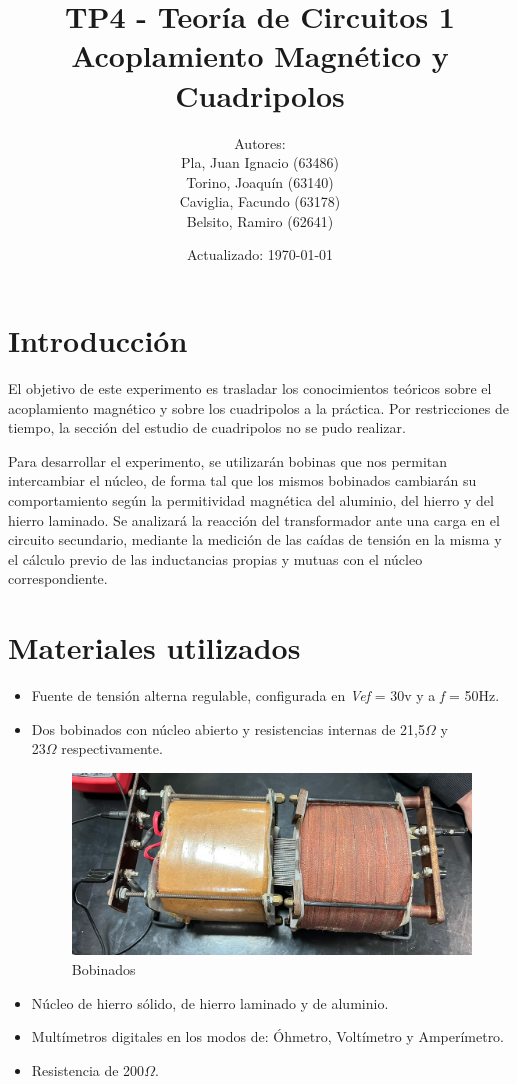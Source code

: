 \documentclass[a4paper,12pt]{article}
\title{TP4 - Teoría de Circuitos 1\\ Acoplamiento Magnético y Cuadripolos}
\author{Autores: \\Pla, Juan Ignacio (63486)\\Torino, Joaquín (63140)\\Caviglia, Facundo (63178)\\Belsito, Ramiro (62641)}
\date{Actualizado: \today}
\begin{document}
\maketitle

\section{Introducción}
\hspace{1cm} El objetivo de este experimento es trasladar los conocimientos teóricos sobre 
el acoplamiento magnético y sobre los cuadripolos a la práctica. Por restricciones de tiempo,
la sección del estudio de cuadripolos no se pudo realizar.

\hspace{1cm}Para desarrollar el experimento, se utilizarán bobinas que nos permitan intercambiar
el núcleo, de forma tal que los mismos bobinados cambiarán su comportamiento según la 
permitividad magnética del aluminio, del hierro y del hierro laminado. Se analizará la reacción
del transformador ante una carga en el circuito secundario, mediante la medición de las caídas de
tensión en la misma y el cálculo previo de las inductancias propias y mutuas con el núcleo correspondiente.


\section{Materiales utilizados}

\begin{itemize}
\item Fuente de tensión alterna regulable, configurada en \textit{Vef} = 30v y a \textit{f} = 50Hz.
\item Dos bobinados con núcleo abierto y resistencias internas de 21,5$\Omega$ y \\
23$\Omega$
respectivamente.
\begin{figure}[H]
    \centering
    \includegraphics[width=0.5\linewidth]{bobinados.jpg}
    \caption{Bobinados}
\end{figure}

\item Núcleo de hierro sólido, de hierro laminado y de aluminio.
\item Multímetros digitales en los modos de: Óhmetro, Voltímetro y Amperímetro.
\item Resistencia de 200$\Omega$.
\end{itemize}
\end{document}
